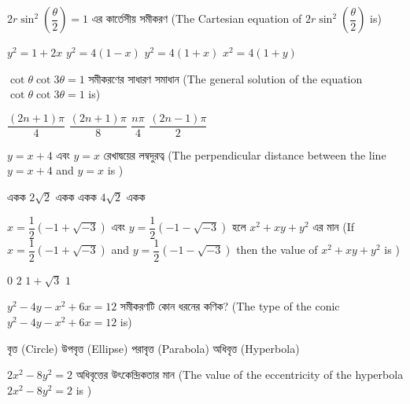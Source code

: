 \documentclass[addpoints]{exam}
\begin{document}
\begin{questions}
\begin{oneparchoices}
\end{oneparchoices}

\question  $ 2r\sin^{2}(\dfrac{\theta}{2}) = 1 $ এর কার্তেসীয় সমীকরণ (The Cartesian equation of $ 2r\sin^{2}(\dfrac{\theta}{2}) $ is)

\begin{oneparchoices}
\choice $ y^{2} = 1+2x $
\choice $ y^{2} = 4(1-x) $
\choice $ y^{2} = 4(1+x) $
\choice $ x^{2} = 4(1+y) $

\end{oneparchoices}

\question   $ \cot\theta \cot 3\theta =1 $ সমীকরণের সাধারণ সমাধান  (The general solution of the equation $ \cot\theta \cot 3\theta =1 $ is)

\begin{oneparchoices}
\choice $ \dfrac{(2n+1)\pi}{4} $
\choice $ \dfrac{(2n+1)\pi}{8} $
\choice $ \dfrac{n\pi}{4} $
\choice  $ \dfrac{(2n-1)\pi}{2} $

\end{oneparchoices}

\question $ y=x+4 $  এবং $ y=x $  রেখাদ্বয়ের লম্বদুরত্ব (The perpendicular distance between the line $ y=x+4 $ and $ y=x $ is ) 

\begin{oneparchoices}
 একক
\choice $2\sqrt{2}$ একক
 একক
\choice  $ 4\sqrt{2} $ একক
\end{oneparchoices}

\question $ x = \dfrac{1}{2}(-1+\sqrt{-3}) $  এবং $ y = \dfrac{1}{2}(-1-\sqrt{-3})  $ হলে $ x^{2} + xy + y^{2} $ এর মান (If $ x = \dfrac{1}{2}(-1+\sqrt{-3}) $ and $ y = \dfrac{1}{2}(-1-\sqrt{-3})  $ then the value of  $ x^{2} + xy + y^{2} $ is )

\begin{oneparchoices}
\choice $ 0 $
\choice $ 2 $
\choice $ 1 + \sqrt{3} $
\choice  $ 1 $

\end{oneparchoices}

\question  $ y^{2}-4y-x^{2}+6x =12 $  সমীকরণটি কোন ধরনের কণিক? (The type of the conic $ y^{2}-4y-x^{2}+6x =12 $ is)

\begin{oneparchoices}
\choice বৃত্ত (Circle)
\choice উপবৃত্ত (Ellipse)
\choice পরাবৃত্ত (Parabola)
\choice  অধিবৃত্ত (Hyperbola)

\end{oneparchoices}

\question  $ 2x^{2}-8y^{2} = 2 $ অধিবৃত্তের উৎকেন্দ্রিকতার মান (The value of the eccentricity of the hyperbola $ 2x^{2}-8y^{2} = 2 $ is )


\end{questions}
\end{document}
